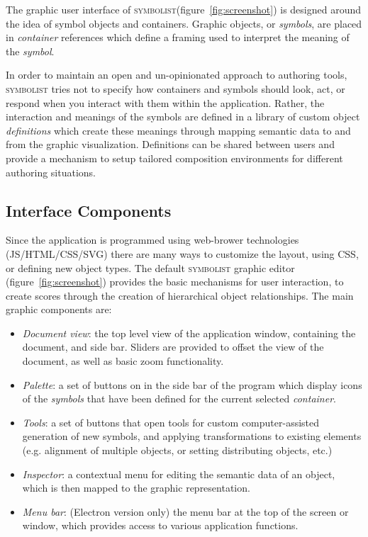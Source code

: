\documentclass{article}
\def\symbolist{\textsc{symbolist}\xspace}
\begin{document}

The graphic user interface of \symbolist (figure~\ref{fig:screenshot}) is designed around the idea of symbol objects and containers. Graphic objects, or \textit{symbols}, are placed in \textit{container} references which define a framing used to interpret the meaning of the \textit{symbol}.

In order to maintain an open and un-opinionated approach to authoring tools, \symbolist tries not to specify how containers and symbols should look, act, or respond when you interact with them within the application. 
Rather, the interaction and meanings of the symbols are defined in a library of custom object \textit{definitions} which create these meanings through mapping semantic data to and from the graphic visualization. 
Definitions can be shared between users and provide a mechanism to setup tailored composition environments for different authoring situations.


\subsection{Interface Components}\label{sec:interface_components}


Since the application is programmed using web-brower technologies (JS/HTML/CSS/SVG) there are many ways to customize the layout, using CSS, or defining new object types. 
The default \symbolist graphic editor (figure~\ref{fig:screenshot}) provides the basic mechanisms for user interaction, to create scores through the creation of hierarchical object relationships.
The main graphic components are:

\begin{itemize}\itemsep0pt 
\item 
\textit{Document view}: the top level view of the application window, containing the document, and side bar. Sliders are provided to offset the view of the document, as well as basic zoom functionality.
\item 
\textit{Palette}: a set of buttons on in the side bar of the program which display icons of the \textit{symbols} that have been defined for the current selected \textit{container}. 
\item 
\textit{Tools}: a set of buttons that open tools for custom computer-assisted generation of new symbols, and applying transformations to existing elements (e.g. alignment of multiple objects, or setting distributing objects, etc.)
\item 
\textit{Inspector}: a contextual menu for editing the semantic data of an object, which is then mapped to the graphic representation.
\item 
\textit{Menu bar}: (Electron version only) the menu bar at the top of the screen or window, which provides access to various application functions.
\end{itemize}
\end{document}
